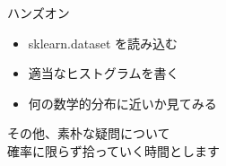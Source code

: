 \documentclass[dvipdfmx,cjk,handout]{beamer}
\begin{document}
\begin{frame}{ハンズオン} \pause

\begin{itemize}
    \item sklearn.dataset を読み込む \pause
    \item 適当なヒストグラムを書く \pause
    \item 何の数学的分布に近いか見てみる \pause
\end{itemize}

\vskip 1cm
その他、素朴な疑問について\\確率に限らず拾っていく時間とします

\end{frame}


\end{document}
